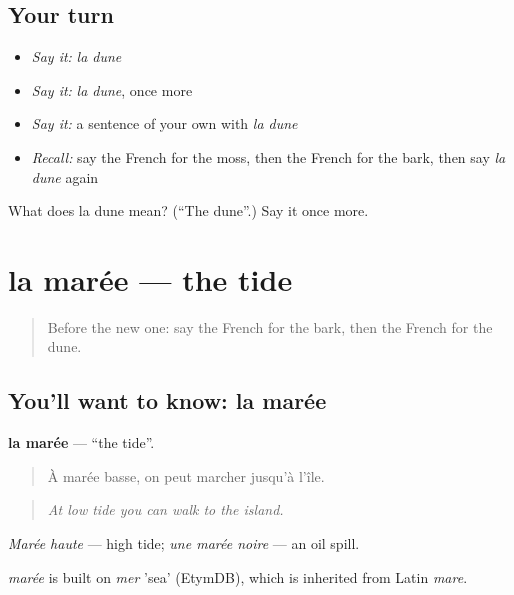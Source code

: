 \subsection*{Your turn}
\begin{itemize}
\raggedright
  \item \emph{Say it:} \emph{la dune}
  \item \emph{Say it:} \emph{la dune}, once more
  \item \emph{Say it:} a sentence of your own with \emph{la dune}
  \item \emph{Recall:} say the French for the moss, then the French for the bark, then say \emph{la dune} again
\end{itemize}

\begin{tcolorbox}[breakable,colback=teal!4,colframe=teal!35!black,title={Before you move on}]
What does la dune mean? (\textquotedblleft{}The dune\textquotedblright{}.) Say it once more.
\end{tcolorbox}
\section[la marée]{la marée — the tide}

\label{lesson:FR-C458-maree}



\begin{quote}
Before the new one: say the French for the bark, then the French for the dune.
\end{quote}

\subsection*{You'll want to know: la marée}
\textbf{la marée} — \textquotedblleft{}the tide\textquotedblright{}.

\begin{quote}
À marée basse, on peut marcher jusqu'à l'île.
\end{quote}

\begin{quote}
\emph{At low tide you can walk to the island.}
\end{quote}

\emph{Marée haute} — high tide; \emph{une marée noire} — an oil spill.

\begin{cousinweb}
\emph{marée} is built on \emph{mer} 'sea' (EtymDB), which is inherited from Latin \emph{mare}.
\end{cousinweb}

